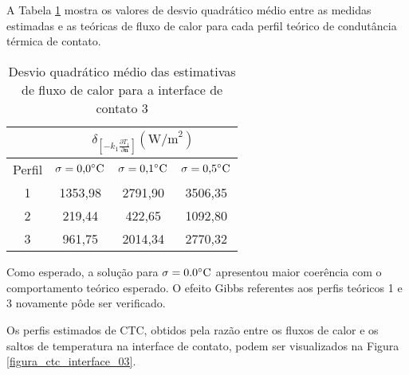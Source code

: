 A Tabela \ref{tabela_rms_fluxo_calor_interface_3} mostra os valores de desvio quadrático médio entre as medidas estimadas e as teóricas de fluxo de calor para cada perfil teórico de condutância térmica de contato.
\begin{table}[H]
	\centering
	\caption{Desvio quadrático médio das estimativas de fluxo de calor para a interface de contato 3}
	\begin{tabular}{c|c|c|c|}
		\cline{2-4}
		& \multicolumn{3}{c|}{$\delta_{\left[-k_1 \frac{\partial T_1}{\partial \mathbf{n}}\right]}(\text{W/m}^2)$} \\ \hline
		\multicolumn{1}{|c|}{Perfil} & $\sigma = \text{0,0}\celsius$   & $\sigma = \text{0,1}\celsius$    & $\sigma = \text{0,5}\celsius$  \\ \hline
		\multicolumn{1}{|c|}{1}      & 1353,98       & 2791,90       & 3506,35     \\ \hline
		\multicolumn{1}{|c|}{2}      & 219,44       & 422,65       & 1092,80      \\ \hline
		\multicolumn{1}{|c|}{3}      & 961,75       & 2014,34       & 2770,32      \\ \hline
	\end{tabular}
	\label{tabela_rms_fluxo_calor_interface_3}
\end{table}

Como esperado, a solução para $\sigma = 0.0\celsius$ apresentou maior coerência com o comportamento teórico esperado. O efeito Gibbs referentes aos perfis teóricos 1 e 3 novamente pôde ser verificado.

%
%

Os perfis estimados de CTC, obtidos pela razão entre os fluxos de calor e os saltos de temperatura na interface de contato, podem ser visualizados na Figura \ref{figura_ctc_interface_03}.

